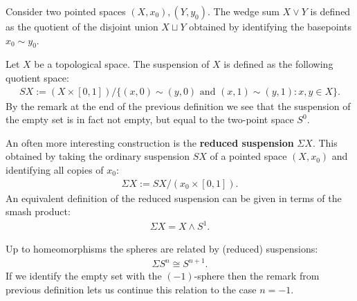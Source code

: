     \begin{construct}
        Consider two pointed spaces $(X, x_0), (Y, y_0)$. The wedge sum $X\vee Y$ is defined as the quotient of the disjoint union $X\sqcup Y$ obtained by identifying the basepoints $x_0\sim y_0$.
    \end{construct}

    \begin{construct}[Suspension]\label{topology:suspension}
        Let $X$ be a topological space. The suspension of $X$ is defined as the following quotient space:
        \begin{gather}
            SX := (X\times [0, 1])/\big\{(x, 0) \sim (y, 0)\text{ and }(x, 1) \sim (y, 1):x, y\in X\big\}.
        \end{gather}
        By the remark at the end of the previous definition we see that the suspension of the empty set is in fact not empty, but equal to the two-point space $S^0$.

        An often more interesting construction is the \textbf{reduced suspension} $\Sigma X$. This obtained by taking the ordinary suspension $SX$ of a pointed space $(X, x_0)$ and identifying all copies of $x_0$:
        \begin{gather}
            \Sigma X := SX/(x_0\times[0,1]).
        \end{gather}
        An equivalent definition of the reduced suspension can be given in terms of the smash product:
        \begin{gather}
            \Sigma X = X\wedge S^1.
        \end{gather}
    \end{construct}
    \begin{example}[Spheres]\label{topology:sphere_suspension}
        Up to homeomorphisms the spheres are related by (reduced) suspensions:
        \begin{gather}
            \Sigma S^n \cong S^{n+1}.
        \end{gather}
        If we identify the empty set with the $(-1)$-sphere then the remark from previous definition lets us continue this relation to the case $n=-1$.
    \end{example}

